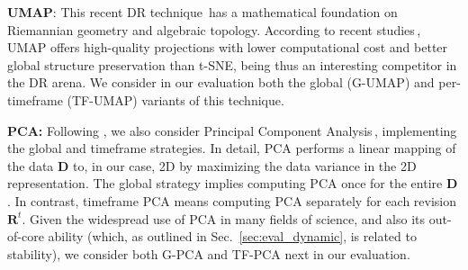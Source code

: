 \noindent\textbf{UMAP}: This recent DR technique\,\cite{umap} has a mathematical foundation on Riemannian geometry and algebraic topology. According to recent studies\,\cite{EspadotoSurvey,Becht2019}, UMAP offers high-quality projections with lower computational cost and better global structure preservation than t-SNE, being thus an interesting competitor in the DR arena.  We consider in our evaluation both the global (G-UMAP) and per-timeframe (TF-UMAP) variants of this technique.


\noindent\textbf{PCA:} Following \cite{Fujiwara2019,Mao2007,Ward2011}, we also consider Principal Component Analysis\,\cite{pca}, implementing the global and timeframe strategies. In detail, PCA performs a linear mapping of the data $\mathbf{D}$ to, in our case, 2D by maximizing the data variance in the 2D representation. The global strategy implies computing PCA once for the entire $\mathbf{D}$. In contrast, timeframe PCA means computing PCA separately for each revision $\mathbf{R}^t$. Given the widespread use of PCA in many fields of science, and also its out-of-core ability (which, as outlined in Sec.~\ref{sec:eval_dynamic}, is related to stability), we consider both G-PCA and TF-PCA next in our evaluation.

